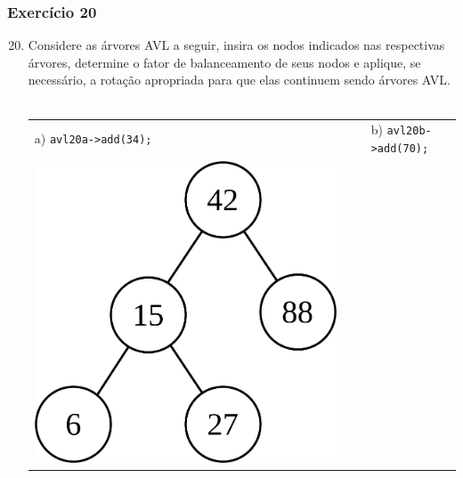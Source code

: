 \documentclass[aspectratio=169]{beamer}
\begin{document}
\begin{frame}[fragile]
\begin{enumerate}
\begin{tabular}{lll}
\end{tabular}
\end{enumerate}
\end{frame}

\begin{frame}[fragile]\frametitle{Exercício 20}
\begin{enumerate}
	\setcounter{enumi}{19}
	\item Considere as árvores AVL a seguir, insira os nodos indicados nas respectivas árvores, determine o fator de balanceamento de seus nodos e aplique, se necessário, a rotação apropriada para que elas continuem sendo árvores AVL.\\~\\
\begin{tabular}{lll}
a) \texttt{avl20a->add(34);}& ~ ~ & b) \texttt{avl20b->add(70);}\\
\includegraphics[height=0.3\paperheight]{imagens/avl19.png} & ~ ~ &

\end{tabular}
\end{enumerate}
\end{frame}
\end{document}
